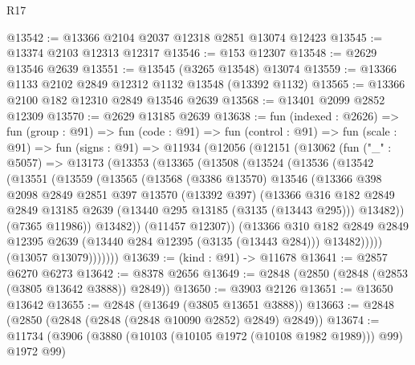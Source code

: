 \begin{lexlean}{R17}
\begin{coremodule}
@13542 := @13366 @2104 @2037 @12318 @2851 @13074 @12423
@13545 := @13374 @2103 @12313 @12317
@13546 := @153 @12307
@13548 := @2629 @13546 @2639
@13551 := @13545 (@3265 @13548) @13074
@13559 := @13366 @1133 @2102 @2849 @12312 @1132 @13548 (@13392 @1132)
@13565 := @13366 @2100 @182 @12310 @2849 @13546 @2639
@13568 := @13401 @2099 @2852 @12309
@13570 := @2629 @13185 @2639
@13638 := fun (indexed : @2626) =>
  fun (group : @91) =>
  fun (code : @91) =>
  fun (control : @91) =>
  fun (scale : @91) =>
  fun (signs : @91) =>
  @11934
    (@12056
      (@12151
        (@13062
          (fun ("_" : @5057) =>
          @13173
            (@13353
              (@13365
                (@13508
                  (@13524
                    (@13536
                      (@13542
                        (@13551
                          (@13559
                            (@13565
                              (@13568
                                (@3386 @13570)
                                @13546
                                (@13366
                                  @398
                                  @2098
                                  @2849
                                  @2851
                                  @397
                                  @13570
                                  (@13392 @397)
                                  (@13366
                                    @316
                                    @182
                                    @2849
                                    @2849
                                    @13185
                                    @2639
                                    (@13440 @295 @13185 (@3135 (@13443 @295)))
                                    @13482))
                                (@7365 @11986))
                              @13482))
                          (@11457 @12307))
                        (@13366
                          @310
                          @182
                          @2849
                          @2849
                          @12395
                          @2639
                          (@13440 @284 @12395 (@3135 (@13443 @284)))
                          @13482)))))
                (@13057 @13079)))))))
@13639 := (kind : @91) -> @11678
@13641 := @2857 @6270 @6273
@13642 := @8378 @2656
@13649 := @2848 (@2850 (@2848 (@2853 (@3805 @13642 @3888)) @2849))
@13650 := @3903 @2126
@13651 := @13650 @13642
@13655 := @2848 (@13649 (@3805 @13651 @3888))
@13663 := @2848 (@2850 (@2848 (@2848 (@2848 @10090 @2852) @2849) @2849))
@13674 := @11734 (@3906 (@3880 (@10103 (@10105 @1972 (@10108 @1982 @1989))) @99) @1972 @99)

\end{coremodule}
\end{lexlean}
